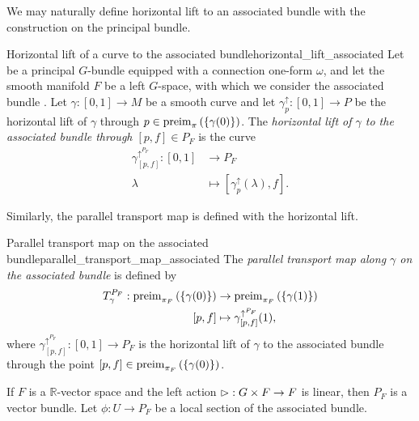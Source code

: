 We may naturally define horizontal lift to an associated bundle with the construction on the principal bundle.
\begin{definition}{Horizontal lift of a curve to the associated bundle}{horizontal_lift_associated}
    Let  be a principal \(G\)-bundle equipped with a connection one-form \(\omega\), and let the smooth manifold \(F\) be a left \(G\)-space, with which we consider the associated bundle . Let \(\gamma : [0,1] \to M\) be a smooth curve and let \(\gamma^\uparrow_p : [0,1] \to P\) be the horizontal lift of \(\gamma\) through \(p \in \operatorname{preim}_{\pi}{\left(\{\gamma(0)\}\right)}\). The \emph{horizontal lift of \(\gamma\) to the associated bundle through \([p,f] \in P_F\)} is the curve
    \begin{align*}
        \gamma^{\uparrow^{P_F}}_{[p,f]} : [0,1] &\to P_F\\
                                        \lambda &\mapsto [\gamma_p^\uparrow(\lambda), f].
    \end{align*}
\end{definition}

Similarly, the parallel transport map is defined with the horizontal lift.
\begin{definition}{Parallel transport map on the associated bundle}{parallel_transport_map_associated}
    The \emph{parallel transport map along \(\gamma\) on the associated bundle } is defined by
    \begin{align*}
        T^{P_F}_{\gamma} : \operatorname{preim}_{\pi_F}{\left(\{\gamma(0)\}\right)} &\to \operatorname{preim}_{\pi_F}{\left(\{\gamma(1)\}\right)}\\
                                                    [p,f] &\mapsto \gamma_{[p,f]}^{\uparrow^{P_F}}(1),
    \end{align*}
    where \(\gamma_{[p,f]}^{\uparrow^{P_F}} : [0,1] \to P_F\) is the horizontal lift of \(\gamma\) to the associated bundle through the point \([p,f] \in \operatorname{preim}_{\pi_F}{\left(\{\gamma(0)\}\right)}\).
\end{definition}

If \(F\) is a \(\mathbb{R}\)-vector space and the left action \(\mathbin{\vartriangleright} : G \times F \to F\) is linear, then \(P_F\) is a vector bundle. Let \(\phi : U \to P_F\) be a local section of the associated bundle. 
